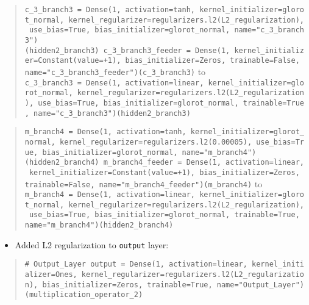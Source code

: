 \documentclass[11pt]{article}
\providecommand{\tightlist}{%
      \setlength{\itemsep}{0pt}\setlength{\parskip}{0pt}}
\begin{document}
\begin{quote}
\texttt{c\_3\_branch3\ =\ Dense(1,\ activation=\textquotesingle{}tanh\textquotesingle{},\ kernel\_initializer=\textquotesingle{}glorot\_normal\textquotesingle{},\ kernel\_regularizer=regularizers.l2(L2\_regularization),\ use\_bias=True,\ bias\_initializer=\textquotesingle{}glorot\_normal\textquotesingle{},\ name="c\_3\_branch3")(hidden2\_branch3)\ c\_3\_branch3\_feeder\ =\ Dense(1,\ kernel\_initializer=Constant(value=+1),\ bias\_initializer=\textquotesingle{}Zeros\textquotesingle{},\ trainable=False,\ name="c\_3\_branch3\_feeder")(c\_3\_branch3)}
to
\texttt{c\_3\_branch3\ =\ Dense(1,\ activation=\textquotesingle{}linear\textquotesingle{},\ kernel\_initializer=\textquotesingle{}glorot\_normal\textquotesingle{},\ kernel\_regularizer=regularizers.l2(L2\_regularization),\ use\_bias=True,\ bias\_initializer=\textquotesingle{}glorot\_normal\textquotesingle{},\ trainable=True,\ name="c\_3\_branch3")(hidden2\_branch3)}
\end{quote}

\begin{quote}
\texttt{m\_branch4\ =\ Dense(1,\ activation=\textquotesingle{}tanh\textquotesingle{},\ kernel\_initializer=\textquotesingle{}glorot\_normal\textquotesingle{},\ kernel\_regularizer=regularizers.l2(0.00005),\ use\_bias=True,\ bias\_initializer=\textquotesingle{}glorot\_normal\textquotesingle{},\ name="m\_branch4")(hidden2\_branch4)\ m\_branch4\_feeder\ =\ Dense(1,\ activation=\textquotesingle{}linear\textquotesingle{},\ kernel\_initializer=Constant(value=+1),\ bias\_initializer=\textquotesingle{}Zeros\textquotesingle{},\ trainable=False,\ name="m\_branch4\_feeder")(m\_branch4)}
to
\texttt{m\_branch4\ =\ Dense(1,\ activation=\textquotesingle{}linear\textquotesingle{},\ kernel\_initializer=\textquotesingle{}glorot\_normal\textquotesingle{},\ kernel\_regularizer=regularizers.l2(L2\_regularization),\ use\_bias=True,\ bias\_initializer=\textquotesingle{}glorot\_normal\textquotesingle{},\ trainable=True,\ name="m\_branch4")(hidden2\_branch4)}
\end{quote}

\begin{itemize}
\tightlist
\item
  Added L2 regularization to \texttt{output} layer:
\end{itemize}

\begin{quote}
\texttt{\#\ Output\_Layer\ output\ =\ Dense(1,\ activation=\textquotesingle{}linear\textquotesingle{},\ kernel\_initializer=\textquotesingle{}Ones\textquotesingle{},\ kernel\_regularizer=regularizers.l2(L2\_regularization),\ bias\_initializer=\textquotesingle{}Zeros\textquotesingle{},\ trainable=True,\ name="Output\_Layer")(multiplication\_operator\_2)}
\end{quote}
\end{document}
